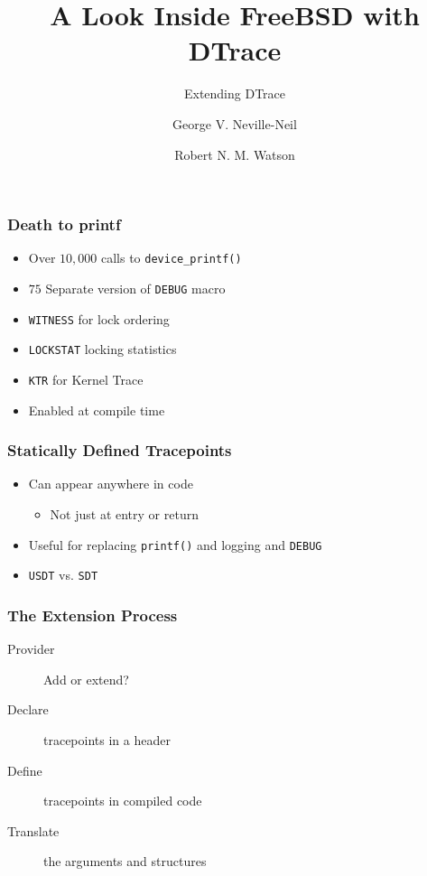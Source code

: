 \documentclass[pdftex]{beamer}
\begin{document}

\title{A Look Inside FreeBSD with DTrace}
\subtitle{Extending DTrace}
\author[shortname]{George V. Neville-Neil \and Robert N. M. Watson}

\begin{frame}
  \titlepage
\end{frame}

\begin{frame}[fragile]
  \frametitle{Death to printf}
  \begin{itemize}
  \item Over $10,000$ calls to \verb|device_printf()|
  \item $75$ Separate version of \verb|DEBUG| macro
  \item \verb|WITNESS| for lock ordering
  \item \verb|LOCKSTAT| locking statistics
  \item \verb|KTR| for Kernel Trace
  \item Enabled at compile time
  \end{itemize}
\end{frame}

\begin{frame}
  \frametitle{Statically Defined Tracepoints}
  \begin{itemize}
  \item Can appear anywhere in code 
    \begin{itemize}
    \item Not just at entry or return
    \end{itemize}
  \item Useful for replacing \verb|printf()| and logging and \verb|DEBUG|
  \item \verb|USDT| vs. \verb|SDT|
  \end{itemize}
\end{frame}

\begin{frame}
  \frametitle{The Extension Process}
  \begin{description}
  \item [Provider] Add or extend? 
  \item [Declare] tracepoints in a header
  \item [Define] tracepoints in compiled code 
  \item [Translate] the arguments and structures
  \end{description}
\end{frame}
\end{document}
